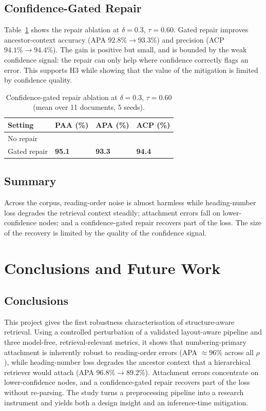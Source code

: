 \documentclass[12pt,a4paper]{report}
\begin{document}
\section{Confidence-Gated Repair}
Table~\ref{tab:repair} shows the repair ablation at $\delta=0.3$, $\tau=0.60$. Gated repair improves
ancestor-context accuracy (APA $92.8\%\rightarrow 93.3\%$) and precision (ACP $94.1\%\rightarrow
94.4\%$). The gain is positive but small, and is bounded by the weak confidence signal: the repair
can only help where confidence correctly flags an error. This supports H3 while showing that the
value of the mitigation is limited by confidence quality.

\begin{table}[!htbp]\centering
\caption{Confidence-gated repair ablation at $\delta=0.3$, $\tau=0.60$ (mean over 11 documents, 5 seeds).}
\label{tab:repair}\renewcommand{\arraystretch}{1.25}{\small
\begin{tabularx}{\textwidth}{@{} X >{\centering\arraybackslash}p{2.2cm} >{\centering\arraybackslash}p{2.2cm} >{\centering\arraybackslash}p{2.2cm} @{}}
\toprule
Setting & PAA (\%) & APA (\%) & ACP (\%) \\ \midrule
No repair & 94.9 & 92.8 & 94.1 \\
Gated repair & \textbf{95.1} & \textbf{93.3} & \textbf{94.4} \\ \bottomrule
\end{tabularx}}
\end{table}

\section{Summary}
Across the corpus, reading-order noise is almost harmless while heading-number loss degrades the
retrieval context steadily; attachment errors fall on lower-confidence nodes; and a confidence-gated
repair recovers part of the loss. The size of the recovery is limited by the quality of the
confidence signal.

\chapter{Conclusions and Future Work}

\section{Conclusions}
This project gives the first robustness characterisation of structure-aware retrieval. Using a
controlled perturbation of a validated layout-aware pipeline and three model-free, retrieval-relevant
metrics, it shows that numbering-primary attachment is inherently robust to reading-order errors
(APA $\approx 96\%$ across all $\rho$), while heading-number loss degrades the ancestor context that a
hierarchical retriever would attach (APA $96.8\%\rightarrow 89.2\%$). Attachment errors concentrate
on lower-confidence nodes, and a confidence-gated repair recovers part of the loss without
re-parsing. The study turns a preprocessing pipeline into a research instrument and yields both a
design insight and an inference-time mitigation.
\end{document}
